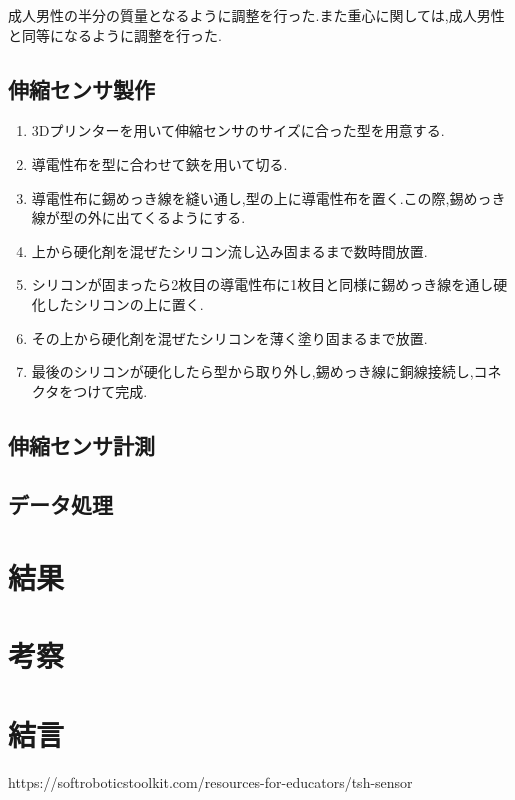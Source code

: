 成人男性の半分の質量となるように調整を行った.また重心に関しては,成人男性と同等になるように調整を行った.
\subsection{伸縮センサ製作}
\begin{enumerate}
    \item 3Dプリンターを用いて伸縮センサのサイズに合った型を用意する.
    \item 導電性布を型に合わせて鋏を用いて切る.
    \item 導電性布に錫めっき線を縫い通し,型の上に導電性布を置く.この際,錫めっき線が型の外に出てくるようにする.
    \item 上から硬化剤を混ぜたシリコン流し込み固まるまで数時間放置.
    \item シリコンが固まったら2枚目の導電性布に1枚目と同様に錫めっき線を通し硬化したシリコンの上に置く.
    \item その上から硬化剤を混ぜたシリコンを薄く塗り固まるまで放置.
    \item 最後のシリコンが硬化したら型から取り外し,錫めっき線に銅線接続し,コネクタをつけて完成.
\end{enumerate}
\subsection{伸縮センサ計測}

\subsection{データ処理}

\section{結果}

\section{考察}

\section{結言}

\small
\begin{thebibliography}{99}
 https://softroboticstoolkit.com/resources-for-educators/tsh-sensor
\end{thebibliography}
\normalsize
